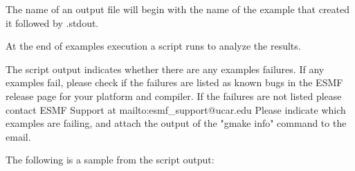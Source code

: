 The name of an output file will begin with the name of the example
that created it followed by .stdout.

At the end of examples execution a script runs to analyze the results.

The script output indicates whether there are any examples failures.
If any examples fail, please check if the failures are listed as known bugs in the ESMF release
page 
for your platform and compiler.
If the failures are not listed please contact ESMF Support at 
{mailto:esmf\_support@ucar.edu}
Please indicate which examples are failing, and attach the output of the "gmake info" command to the email.


The following is a sample from the script output:

